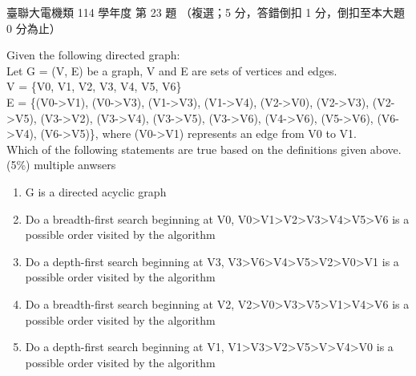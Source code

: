 \begin{pastexam}[label={px:ust-114-ee-ds-23}]{臺聯大電機類 114 學年度 第 23 題}
（複選；5 分，答錯倒扣 1 分，倒扣至本大題 0 分為止）

Given the following directed graph:\\
Let G = (V, E) be a graph, V and E are sets of vertices and edges.\\
V = \{V0, V1, V2, V3, V4, V5, V6\}\\
E = \{(V0->V1), (V0->V3), (V1->V3), (V1->V4), (V2->V0), (V2->V3), (V2->V5), (V3->V2), (V3->V4),
(V3->V5), (V3->V6), (V4->V6), (V5->V6), (V6->V4), (V6->V5)\}, where (V0->V1) represents an edge from
V0 to V1.\\
Which of the following statements are true based on the definitions given above. (5\%) multiple
anwsers
\begin{enumerate}[label=(\Alph*)]
\item G is a directed acyclic graph
\item Do a breadth-first search beginning at V0, V0>V1>V2>V3>V4>V5>V6 is a possible order visited by
the algorithm
\item Do a depth-first search beginning at V3, V3>V6>V4>V5>V2>V0>V1 is a possible order visited by
the algorithm
\item Do a breadth-first search beginning at V2, V2>V0>V3>V5>V1>V4>V6 is a possible order visited by
the algorithm
\item Do a depth-first search beginning at V1, V1>V3>V2>V5>V>V4>V0 is a possible order visited by the
algorithm
\end{enumerate}
\end{pastexam}

